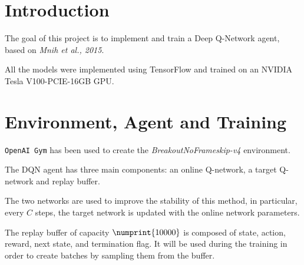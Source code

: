 \documentclass[a4paper,12pt]{article} %
\begin{document}
	\thispagestyle{empty}  
	\vspace{0.4cm}

	
	\section{Introduction}
	\label{section:intro}
	
	The goal of this project is to implement and train a Deep Q-Network agent, based on \textit{Mnih et al., 2015}.
	
	All the models were implemented using TensorFlow and trained on an NVIDIA Tesla V100-PCIE-16GB GPU.
	
	\section{Environment, Agent and Training}
	\label{section:agent}	
	\texttt{OpenAI Gym} has been used to create the \textit{BreakoutNoFrameskip-v4} environment. 
	
	The DQN agent has three main components: an online Q-network, a target Q-network and replay buffer.
	
	The two networks are used to improve the stability of this method, in particular, every $C$ steps, the target network is updated with the online network parameters.
	
	The replay buffer of capacity $\numprint{10000}$ is composed of state, action, reward, next state, and termination flag. It will be used during the training in order to create batches by sampling them from the buffer.
	\bigskip
	
\end{document}
